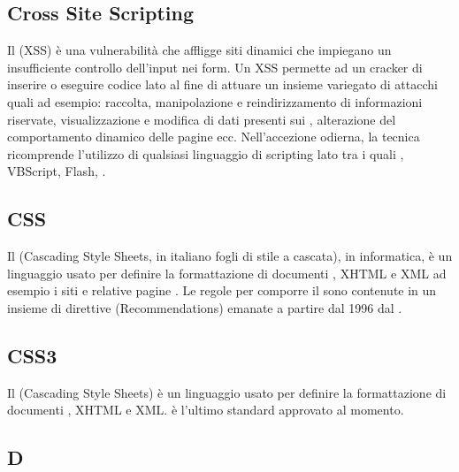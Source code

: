 \subsection*{Cross Site Scripting}
Il  (XSS) è una vulnerabilità che affligge siti  dinamici che impiegano un insufficiente controllo dell'input nei form. Un XSS permette ad un cracker di inserire o eseguire codice lato  al fine di attuare un insieme variegato di attacchi quali ad esempio: raccolta, manipolazione e reindirizzamento di informazioni riservate, visualizzazione e modifica di dati presenti sui , alterazione del comportamento dinamico delle pagine  ecc. Nell'accezione odierna, la tecnica ricomprende l'utilizzo di qualsiasi linguaggio di scripting lato  tra i quali , VBScript, Flash, .

\subsection*{CSS}
Il  (Cascading Style Sheets, in italiano fogli di stile a cascata), in informatica, è un linguaggio usato per definire la formattazione di documenti , XHTML e XML ad esempio i siti  e relative pagine . Le regole per comporre il  sono contenute in un insieme di direttive (Recommendations) emanate a partire dal 1996 dal .

\subsection*{CSS3}
Il  (Cascading Style Sheets) è un linguaggio usato per definire la formattazione di documenti , XHTML e XML.
 è l'ultimo standard approvato al momento.

\newpage

\begin{center}
\Huge\section*{\uppercase{D}}
\end{center}

